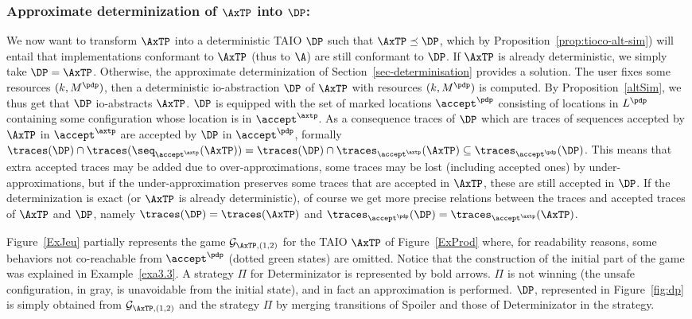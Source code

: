 \documentclass{LMCS}
\theoremstyle{plain}\newtheorem{proposition}[thm]{Proposition}
\begin{document}
\subsubsection*{Approximate determinization of $\AxTP$ into $\DP$:}
We now want to transform $\AxTP$ into a deterministic TAIO $\DP$
such that $\AxTP \preceq \DP$, which  by Proposition~\ref{prop:tioco-alt-sim})
will entail that implementations conformant to $\AxTP$ (thus to $\A$) 
are still conformant to $\DP$. 
If $\AxTP$ is already deterministic, we simply take $\DP=\AxTP$.
Otherwise, 
the approximate determinization of Section~\ref{sec-determinisation} provides a solution.
The user fixes some resources $(k,M^\pdp)$,
then a deterministic io-abstraction  $\DP$ of $\AxTP$ with  resources $(k,M^\pdp)$ is computed.
By Proposition~\ref{altSim}, we thus get that  $\DP$ io-abstracts $\AxTP$.
$\DP$ is equipped with the set of marked locations $\accept^\pdp$
consisting of locations in $L^\pdp$ containing some configuration
whose location is in $\accept^\axtp$. 
As a consequence traces of $\DP$ which are traces of sequences accepted by $\AxTP$ 
in $\accept^\axtp$ are accepted by $\DP$ in $\accept^\pdp$,  formally 
$\traces(\DP) \cap \traces(\seq_{\accept^\axtp}(\AxTP)) = 
\traces(\DP) \cap \traces_{\accept^\axtp}(\AxTP) \subseteq \traces_{\accept^\pdp}(\DP)$.
This means that extra accepted traces may be added due to over-approximations, 
some traces may be lost (including accepted ones) 
by under-approximations, but if the under-approximation preserves
some traces that are accepted in $\AxTP$, these are still accepted in $\DP$.   
If the determinization is exact (or $\AxTP$ is already deterministic), 
of course we get more precise relations between the traces and accepted traces of $\AxTP$ and $\DP$,
namely
 $\traces(\DP) = \traces(\AxTP)$ and
$\traces_{\accept^\pdp}(\DP) = \traces_{\accept^\axtp}(\AxTP)$.  



\begin{exa}
Figure~\ref{ExJeu}
partially represents the game $\mathcal{G}_{\AxTP,(1,2)}$ for the TAIO $\AxTP$ of Figure~\ref{ExProd} where,
for readability reasons, some behaviors not co-reachable from
$\accept^\pdp$ (dotted green states) are omitted.
Notice that the construction of the initial part of the game was explained  
in Example~\ref{exa3.3}.
A strategy $\Pi$ for Determinizator is represented by bold arrows.
$\Pi$ is not winning (the unsafe configuration, in gray, is unavoidable from the initial state), 
and in fact an approximation is performed.
$\DP$, represented in Figure~\ref{fig:dp} 
is simply obtained from $\mathcal{G}_{\AxTP,(1,2)}$ and the strategy $\Pi$ 
by merging transitions of Spoiler and those of Determinizator in the strategy.
\end{exa}
\end{document}

